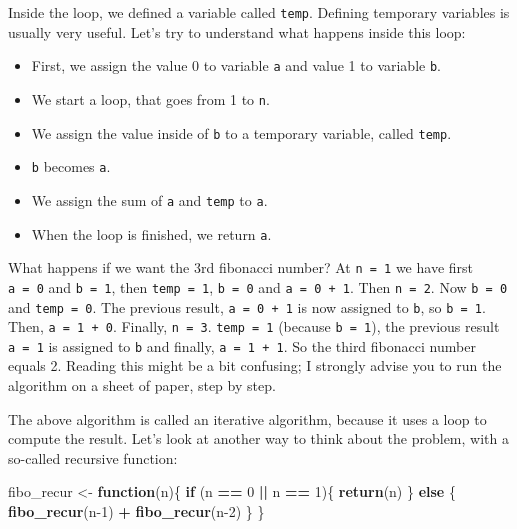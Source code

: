\documentclass[
]{article}
\newenvironment{Shaded}{\begin{snugshade}}{\end{snugshade}}
\newcommand{\ControlFlowTok}[1]{\textcolor[rgb]{0.13,0.29,0.53}{\textbf{#1}}}
\newcommand{\DecValTok}[1]{\textcolor[rgb]{0.00,0.00,0.81}{#1}}
\newcommand{\KeywordTok}[1]{\textcolor[rgb]{0.13,0.29,0.53}{\textbf{#1}}}
\newcommand{\NormalTok}[1]{#1}
\newcommand{\OperatorTok}[1]{\textcolor[rgb]{0.81,0.36,0.00}{\textbf{#1}}}
\newcommand{\StringTok}[1]{\textcolor[rgb]{0.31,0.60,0.02}{#1}}
\providecommand{\tightlist}{%
  \setlength{\itemsep}{0pt}\setlength{\parskip}{0pt}}
\begin{document}
Inside the loop, we defined a variable called \texttt{temp}. Defining temporary variables is usually very
useful. Let's try to understand what happens inside this loop:

\begin{itemize}
\tightlist
\item
  First, we assign the value 0 to variable \texttt{a} and value 1 to variable \texttt{b}.
\item
  We start a loop, that goes from 1 to \texttt{n}.
\item
  We assign the value inside of \texttt{b} to a temporary variable, called \texttt{temp}.
\item
  \texttt{b} becomes \texttt{a}.
\item
  We assign the sum of \texttt{a} and \texttt{temp} to \texttt{a}.
\item
  When the loop is finished, we return \texttt{a}.
\end{itemize}

What happens if we want the 3rd fibonacci number? At \texttt{n\ =\ 1} we have first \texttt{a\ =\ 0} and \texttt{b\ =\ 1},
then \texttt{temp\ =\ 1}, \texttt{b\ =\ 0} and \texttt{a\ =\ 0\ +\ 1}. Then \texttt{n\ =\ 2}. Now \texttt{b\ =\ 0} and \texttt{temp\ =\ 0}. The previous
result, \texttt{a\ =\ 0\ +\ 1} is now assigned to \texttt{b}, so \texttt{b\ =\ 1}. Then, \texttt{a\ =\ 1\ +\ 0}. Finally, \texttt{n\ =\ 3}. \texttt{temp\ =\ 1} (because \texttt{b\ =\ 1}), the previous result \texttt{a\ =\ 1} is assigned to \texttt{b} and finally, \texttt{a\ =\ 1\ +\ 1}. So
the third fibonacci number equals 2. Reading this might be a bit confusing; I strongly advise you
to run the algorithm on a sheet of paper, step by step.

The above algorithm is called an iterative algorithm, because it uses a loop to compute the result.
Let's look at another way to think about the problem, with a so-called recursive function:

\begin{Shaded}
\begin{Highlighting}[]
\NormalTok{fibo\_recur \textless{}{-}}\StringTok{ }\ControlFlowTok{function}\NormalTok{(n)\{}
 \ControlFlowTok{if}\NormalTok{ (n }\OperatorTok{==}\StringTok{ }\DecValTok{0} \OperatorTok{||}\StringTok{ }\NormalTok{n }\OperatorTok{==}\StringTok{ }\DecValTok{1}\NormalTok{)\{}
   \KeywordTok{return}\NormalTok{(n)}
\NormalTok{   \} }\ControlFlowTok{else}\NormalTok{ \{}
   \KeywordTok{fibo\_recur}\NormalTok{(n}\DecValTok{{-}1}\NormalTok{) }\OperatorTok{+}\StringTok{ }\KeywordTok{fibo\_recur}\NormalTok{(n}\DecValTok{{-}2}\NormalTok{)}
\NormalTok{   \}}
\NormalTok{\}}
\end{Highlighting}
\end{Shaded}
\end{document}
